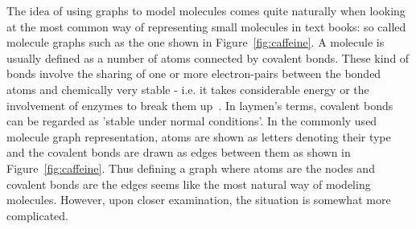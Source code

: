 The idea of using graphs to model molecules comes quite naturally when looking at the most common way of representing small molecules in text books: so called molecule graphs such as the one shown in Figure~\ref{fig:caffeine}. A molecule is usually defined as a number of atoms connected by covalent bonds. These kind of bonds involve the sharing of one or more electron-pairs between the bonded atoms and chemically very stable - i.e. it takes considerable energy or the involvement of enzymes to break them up~\cite{Organic-chemistry}. In laymen's terms, covalent bonds can be regarded as 'stable under normal conditions'. In the commonly used molecule graph representation, atoms are shown as letters denoting their type and the covalent bonds are drawn as edges between them as shown in Figure~\ref{fig:caffeine}. Thus defining a graph where atoms are the nodes and covalent bonds are the edges seems like the most natural way of modeling molecules. However, upon closer examination, the situation is somewhat more complicated.


